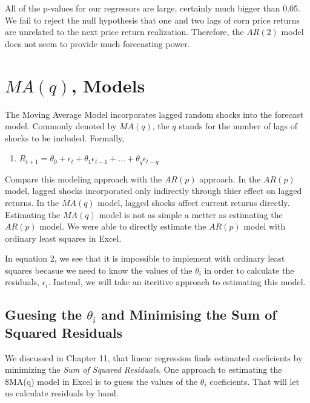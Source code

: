 \documentclass[
  letterpaper,
  DIV=11,
  numbers=noendperiod]{scrreprt}
\providecommand{\tightlist}{%
  \setlength{\itemsep}{0pt}\setlength{\parskip}{0pt}}\usepackage{longtable,booktabs,array}
\begin{document}
All of the p-values for our regressors are large, certainly much bigger
than 0.05. We fail to reject the null hypothesis that one and two lags
of corn price returns are unrelated to the next price return
realization. Therefore, the \(AR(2)\) model does not seem to provide
much forecasting power.

\section{\texorpdfstring{\(MA(q)\),
Models}{MA(q), Models}}\label{maq-models}

The Moving Average Model incorporates lagged random shocks into the
forecast model. Commonly denoted by \(MA(q)\), the \(q\) stands for the
number of lags of shocks to be included. Formally,

\begin{enumerate}
\def\labelenumi{\arabic{enumi}.}
\setcounter{enumi}{1}
\tightlist
\item
  \(R_{t+1} = \theta_0 + \epsilon_t + \theta_1\epsilon_{t-1} + ... + \theta_q\epsilon_{t-q}\)
\end{enumerate}

Compare this modeling approach with the \(AR(p)\) approach. In the
\(AR(p)\) model, lagged shocks incorporated only indirectly through
thier effect on lagged returns. In the \(MA(q)\) model, lagged shocks
affect current returns directly. Estimating the \(MA(q)\) model is not
as simple a metter as estimating the \(AR(p)\) model. We were able to
directly estimate the \(AR(p)\) model with ordinary least squares in
Excel.

In equation 2, we see that it is impossible to implement with ordinary
least squares becasue we need to know the values of the \(\theta_i\) in
order to calculate the residuals, \(\epsilon_i\). Instead, we will take
an iteritive approach to estimating this model.

\subsection{\texorpdfstring{Guesing the \(\theta_i\) and Minimising the
Sum of Squared
Residuals}{Guesing the \textbackslash theta\_i and Minimising the Sum of Squared Residuals}}\label{guesing-the-theta_i-and-minimising-the-sum-of-squared-residuals}

We discussed in Chapter 11, that linear regression finds estimated
coeficients by minimizing the \emph{Sum of Squared Residuals}. One
approach to estimating the \$MA(q) model in Excel is to guess the values
of the \(\theta_i\) coeficients. That will let us calculate residuals by
hand.
\end{document}
